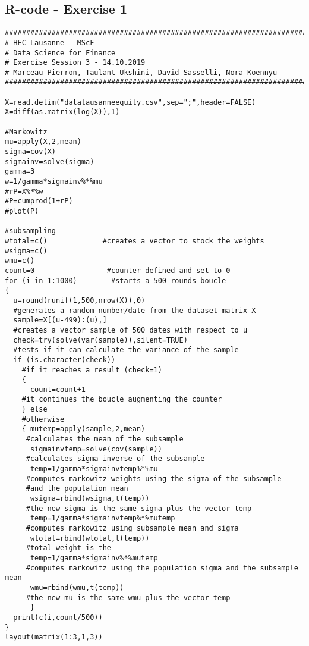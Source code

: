 \begin{appendices}

\chapter{R-code - Exercise 1}

\begin{verbatim}
##########################################################################
# HEC Lausanne - MScF
# Data Science for Finance
# Exercise Session 3 - 14.10.2019
# Marceau Pierron, Taulant Ukshini, David Sasselli, Nora Koennyu
##########################################################################

X=read.delim("datalausanneequity.csv",sep=";",header=FALSE)
X=diff(as.matrix(log(X)),1)

#Markowitz
mu=apply(X,2,mean)
sigma=cov(X)
sigmainv=solve(sigma)
gamma=3
w=1/gamma*sigmainv%*%mu
#rP=X%*%w
#P=cumprod(1+rP)
#plot(P)

#subsampling
wtotal=c()             #creates a vector to stock the weights
wsigma=c()
wmu=c()
count=0                 #counter defined and set to 0
for (i in 1:1000)        #starts a 500 rounds boucle
{
  u=round(runif(1,500,nrow(X)),0)               
  #generates a random number/date from the dataset matrix X
  sample=X[(u-499):(u),]                        
  #creates a vector sample of 500 dates with respect to u
  check=try(solve(var(sample)),silent=TRUE)     
  #tests if it can calculate the variance of the sample
  if (is.character(check))                      
    #if it reaches a result (check=1)
    {
      count=count+1                             
    #it continues the boucle augmenting the counter
    } else                                      
    #otherwise
    { mutemp=apply(sample,2,mean)               
     #calculates the mean of the subsample
      sigmainvtemp=solve(cov(sample))           
     #calculates sigma inverse of the subsample
      temp=1/gamma*sigmainvtemp%*%mu            
     #computes markowitz weights using the sigma of the subsample
     #and the population mean
      wsigma=rbind(wsigma,t(temp))              
     #the new sigma is the same sigma plus the vector temp
      temp=1/gamma*sigmainvtemp%*%mutemp        
     #computes markowitz using subsample mean and sigma
      wtotal=rbind(wtotal,t(temp))              
     #total weight is the 
      temp=1/gamma*sigmainv%*%mutemp            
     #computes markowitz using the population sigma and the subsample mean
      wmu=rbind(wmu,t(temp))                    
     #the new mu is the same wmu plus the vector temp 
      }
  print(c(i,count/500))
}
layout(matrix(1:3,1,3))


\end{verbatim}
\end{appendices}
